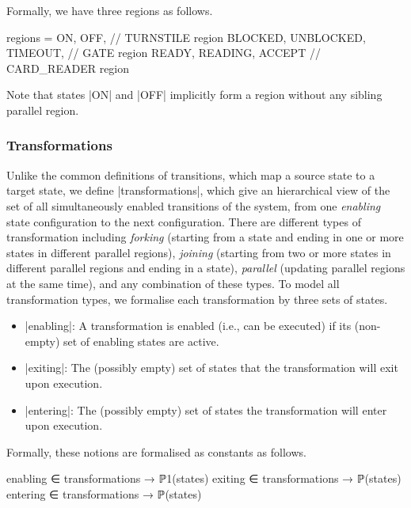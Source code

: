 \begin{example}[Turnstile Example. Regions]
    Formally, we have three regions as follows.
\begin{EventBcode}
regions = { {ON, OFF}, // TURNSTILE region
	{BLOCKED, UNBLOCKED, TIMEOUT}, // GATE region
	{READY, READING, ACCEPT}	// CARD_READER region
}
\end{EventBcode}
Note that states |ON| and |OFF| implicitly form a region without any sibling parallel region.
\end{example}

\subsubsection{Transformations} Unlike the common definitions of transitions, which map a source state to a target state, we define |transformations|, which give an hierarchical view of the set of all simultaneously enabled transitions of the system, from one \emph{enabling} state configuration to the next configuration. 
There are different types of transformation including 
\emph{forking} (starting from a state and ending in one or more states in different parallel regions), 
\emph{joining} (starting from two or more states in different parallel regions and ending in a state), \emph{parallel} (updating parallel regions at the same time), 
and any combination of these types. 
To model all transformation types, we formalise each transformation by three sets of states.
\begin{itemize}
\item |enabling|: A transformation is enabled (i.e., can be executed)
  if its (non-empty) set of enabling states are active.
  
\item |exiting|: The (possibly empty) set of states that the transformation
  will exit upon execution.
  
\item |entering|: The (possibly empty) set of states the transformation will enter upon
  execution.
\end{itemize}
Formally, these notions are formalised as constants as follows.
\begin{EventBcode}
enabling ∈ transformations → ℙ1(states)
exiting ∈ transformations → ℙ(states)
entering ∈ transformations → ℙ(states)
\end{EventBcode}

